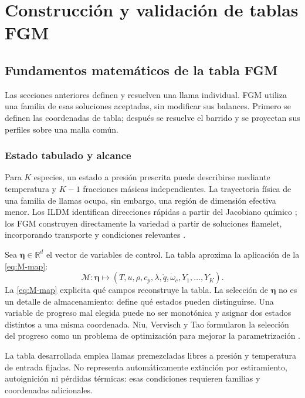\documentclass[12pt,a4paper,twoside,openany]{book}
\begin{document}
\section{Construcción y validación de tablas FGM}
\label{chap:fgm}

\subsection{Fundamentos matemáticos de la tabla FGM}
\label{sec:fgm-fundamentals}

Las secciones anteriores definen y resuelven una llama individual. FGM utiliza
una familia de esas soluciones aceptadas, sin modificar sus balances.
Primero se definen las coordenadas de tabla; después se resuelve el barrido
y se proyectan sus perfiles sobre una malla común.

\subsubsection{Estado tabulado y alcance}

Para \(K\) especies, un estado a presión prescrita puede describirse mediante
temperatura y \(K-1\) fracciones másicas independientes. La trayectoria física de
una familia de llamas ocupa, sin embargo, una región de dimensión efectiva menor.
Los ILDM identifican direcciones rápidas a partir del Jacobiano químico
\cite{MaasPope1992}; los FGM construyen directamente la variedad a partir de
soluciones flamelet, incorporando transporte y condiciones relevantes
\cite{vanOijen2000}.

Sea \(\boldsymbol{\eta}\in\mathbb{R}^d\) el vector de variables de control. La
tabla aproxima la aplicación de la \cref{eq:M-map}:
\begin{equation}
  \mathcal{M}:\boldsymbol{\eta}\mapsto
  \left(T,u,\rho,c_p,\lambda,\dot q,\dot\omega_c,
  Y_1,\ldots,Y_K\right).
  \label{eq:M-map}
\end{equation}
La \cref{eq:M-map} explicita qué campos reconstruye la tabla. La selección de
\(\boldsymbol{\eta}\) no es un detalle de almacenamiento: define
qué estados pueden distinguirse. Una variable de progreso mal elegida puede no
ser monotónica y asignar dos estados distintos a una misma coordenada. Niu,
Vervisch y Tao formularon la selección del progreso como un problema de
optimización para mejorar la parametrización \cite{Niu2013}.

La tabla desarrollada emplea llamas premezcladas libres a presión y temperatura
de entrada fijadas. No representa automáticamente extinción por estiramiento,
autoignición ni pérdidas térmicas: esas condiciones requieren familias y
coordenadas adicionales.
\end{document}
